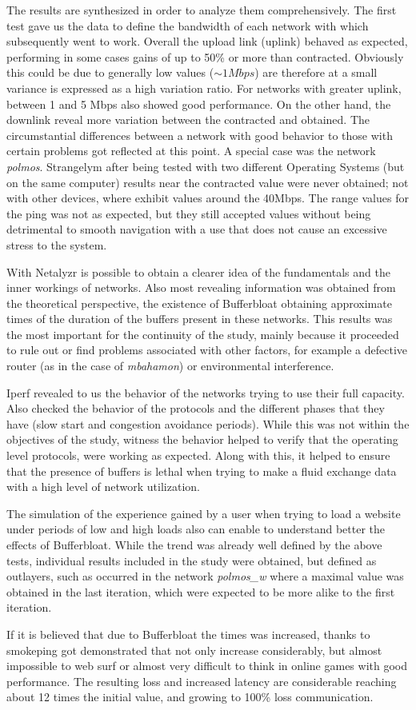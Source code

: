 The results are synthesized in order to analyze them comprehensively. 
The first test gave us the data to define the bandwidth of each
network with which subsequently went to work. Overall the upload link (uplink)
behaved as expected, performing in some cases gains of up to 50\% or more than
contracted. Obviously this could be due to generally low values ($\sim1Mbps$)
are therefore at a small variance is expressed as a high variation ratio. For
networks with greater uplink, between 1 and 5 Mbps also showed good
performance. On the other hand, the downlink reveal more variation between the
contracted and obtained. The circumstantial differences between a network with
good behavior to those with certain problems got reflected at this point. A
special case was the network \textit{polmos}. Strangelym after being tested with two
different Operating Systems (but on the same computer) results near
the contracted value were never obtained; not with other devices, where exhibit
values around the 40Mbps. The range values for the ping was not as expected,
but they still accepted values without being detrimental to smooth navigation
with a use that does not cause an excessive stress to the system.

With Netalyzr is possible to obtain a clearer idea of the fundamentals and the
inner workings of networks. Also most revealing information was obtained from
the theoretical perspective, the existence of Bufferbloat obtaining
approximate times of the duration of the buffers present in these networks.
This results was the most important for the continuity of the study, mainly
because it proceeded to rule out or find problems associated with other
factors, for example a defective router (as in the case of \textit{mbahamon})
or environmental interference.

Iperf revealed to us the behavior of the networks trying to use their full
capacity. Also checked the behavior of the protocols and the different phases
that they have (slow start and congestion avoidance periods). While this was
not within the objectives of the study, witness the behavior helped to verify
that the operating level protocols, were working as expected. Along with this,
it helped to ensure that the presence of buffers is lethal when trying to make
a fluid exchange data with a high level of network utilization.

The simulation of the experience gained by a user when trying to load a
website under periods of low and high loads also can enable to understand
better the effects of Bufferbloat. While the trend was already well defined by
the above tests, individual results included in the study were obtained, but
defined as outlayers, such as occurred in the network \textit{polmos\_w} where
a maximal value was obtained in the last iteration, which were expected  to be
more alike to the first iteration.

If it is believed that due to Bufferbloat the times was increased, thanks to
smokeping got demonstrated that not only increase considerably, but almost
impossible to web surf or almost very difficult to think in online games with
good performance. The resulting loss and increased latency are considerable
reaching about 12 times the initial value, and growing to 100\% loss
communication.

